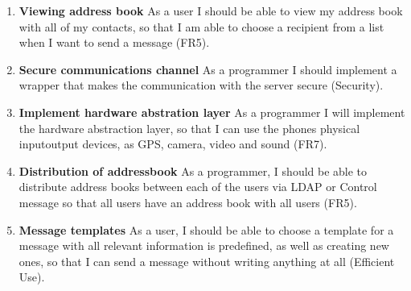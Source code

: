 \begin{enumerate}
			\item {\bf Viewing address book} As a user I should be able to view my address book with all of my contacts, so that I am able to choose a recipient from a list when I want to send a message (FR5).
			\item {\bf Secure communications channel} As a programmer I should implement a wrapper that makes the communication with the server secure (Security).
			\item {\bf Implement hardware abstration layer} As a programmer I will implement the hardware abstraction layer, so that I can use the phones physical input\/output devices, as GPS, camera, video and sound (FR7).
			\item {\bf Distribution of addressbook} As a programmer, I should be able to distribute address books between each of the users via LDAP or Control message so that all users have an address book with all users (FR5).
			\item {\bf Message templates} As a user, I should be able to choose a template for a message with all relevant information is predefined, as well as creating new ones, so that I can send a message without writing anything at all (Efficient Use).
		\end{enumerate}